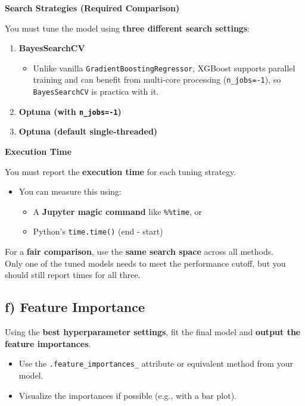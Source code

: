 \documentclass[
  letterpaper,
  DIV=11,
  numbers=noendperiod]{scrreprt}
\providecommand{\tightlist}{%
  \setlength{\itemsep}{0pt}\setlength{\parskip}{0pt}}\usepackage{longtable,booktabs,array}
\begin{document}
\textbf{Search Strategies (Required Comparison)}

You must tune the model using \textbf{three different search settings}:

\begin{enumerate}
\def\labelenumi{\arabic{enumi}.}
\item
  \textbf{BayesSearchCV}

  \begin{itemize}
  \tightlist
  \item
    Unlike vanilla \texttt{GradientBoostingRegressor}, XGBoost supports
    parallel training and can benefit from multi-core processing
    (\texttt{n\_jobs=-1}), so \texttt{BayesSearchCV} is practica with
    it.
  \end{itemize}
\item
  \textbf{Optuna (with \texttt{n\_jobs=-1})}
\item
  \textbf{Optuna (default single-threaded)}
\end{enumerate}

\textbf{Execution Time}

You must report the \textbf{execution time} for each tuning strategy.

\begin{itemize}
\tightlist
\item
  You can measure this using:

  \begin{itemize}
  \tightlist
  \item
    A \textbf{Jupyter magic command} like \texttt{\%\%time}, or
  \item
    Python's \texttt{time.time()} (end - start)
  \end{itemize}
\end{itemize}

For a \textbf{fair comparison}, use the \textbf{same search space}
across all methods.\\
Only one of the tuned models needs to meet the performance cutoff, but
you should still report times for all three.

\subsection{f) Feature Importance}\label{f-feature-importance}

Using the \textbf{best hyperparameter settings}, fit the final model and
\textbf{output the feature importances}.

\begin{itemize}
\tightlist
\item
  Use the \texttt{.feature\_importances\_} attribute or equivalent
  method from your model.
\item
  Visualize the importances if possible (e.g., with a bar plot).
\end{itemize}
\end{document}
